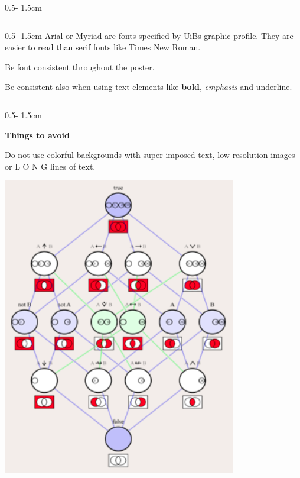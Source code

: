 \documentclass{uibposter}
\begin{document}
\begin{frame}
\begin{columns}
\begin{column}{0.5\textwidth - 1.5cm}
\begin{column}{0.5\textwidth - 1.5cm}
    Arial or Myriad are fonts specified by UiBs graphic profile. They are easier to read than serif fonts like Times New Roman. 
\vspace{0.2cm}

    Be font consistent throughout the poster. 
\vspace{0.2cm}

    Be consistent also when using text elements like \textbf{bold}, \textit{emphasis} and \underline{underline}. 
\end{column}
\begin{column}{0.5\textwidth - 1.5cm}
\vspace*{-25.5cm}

    \textbf{Things to avoid}
\vspace{0.5cm}

    Do not use colorful backgrounds with super-imposed text, low-resolution images or L O N G lines of text.
        \vspace{1.5cm}
        
    \vspace{1.5cm}
    
    \includegraphics[width = \textwidth]{uibposter-images/bilde3.png}


\end{column}
\end{column}
\end{columns}
\end{frame}
\end{document}
